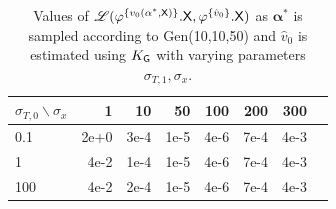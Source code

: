 \begin{table}
    \caption{Values of $\mathscr{L}(\varphi^{\{v_0(\mathbf{\alpha}^*,\mathsf{X})\}}.\mathsf{X},\varphi^{\{\hat{v}_0\}}.\mathsf{X})$ as $\mathbf{\alpha}^*$ is sampled according to Gen(10,10,50) and $\hat{v}_0$ is estimated using $K_{\mathsf{G}}$ with varying parameters $\sigma_{T,1},\sigma_x$.}
      \centering
         \begin{tabular}{lrrrrrrr}
         \toprule
         $\sigma_{T,0} \backslash \sigma_x$  & 1 & 10 & 50 & 100 & 200 & 300 \\
         \midrule
         0.1 & 2e+0 & 3e-4  & 1e-5&4e-6&7e-4&4e-3 \\
        1 & 4e-2 & 1e-4  & 1e-5&4e-6&7e-4 &4e-3  \\
         100 & 4e-2 & 2e-4  & 1e-5&4e-6&7e-4&4e-3  \\
         \bottomrule
         \end{tabular}
      \label{table:synthetic2}
      \vspace{-1em}
  \end{table}
 


